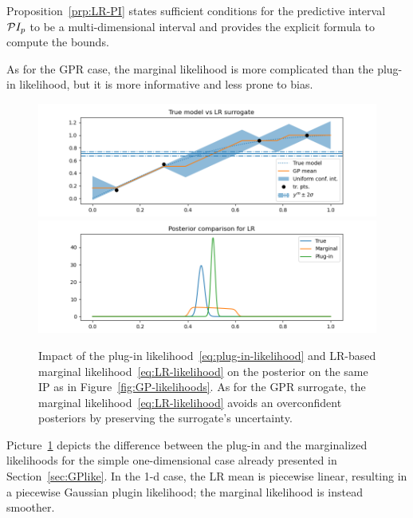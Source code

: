 \begin{rmk}
    Proposition~\ref{prp:LR-PI} states sufficient conditions for the predictive interval $\mathcal PI_p$ to be a multi-dimensional interval and provides the explicit formula to compute the bounds.
\end{rmk}

As for the GPR case, the marginal likelihood is more complicated than the plug-in likelihood, but it is more informative and less prone to bias. 
\begin{figure}[H] 

    \begin{centering}
    \includegraphics[width = 360pt]{results/pictures/d1/LR_model_comparison.png}
    \includegraphics[width = 360pt]{results/pictures/d1/LR_posterior_comparison.png}
    \end{centering}
    
    \caption{Impact of the plug-in likelihood~\eqref{eq:plug-in-likelihood} and LR-based marginal likelihood~\eqref{eq:LR-likelihood} on the posterior on the same IP as in Figure~\ref{fig:GP-likelihoods}. As for the GPR surrogate, the marginal likelihood~\eqref{eq:LR-likelihood} avoids an overconfident posteriors by preserving the surrogate's uncertainty.} 
    \label{fig:LR-likelihoods}
\end{figure}  

Picture~\ref{fig:LR-likelihoods} depicts the difference between the plug-in and the marginalized likelihoods for the simple one-dimensional case already presented in Section~\ref{sec:GPlike}. 
In the 1-d case, the LR mean is piecewise linear, resulting in a piecewise Gaussian plugin likelihood; the marginal likelihood is instead smoother.